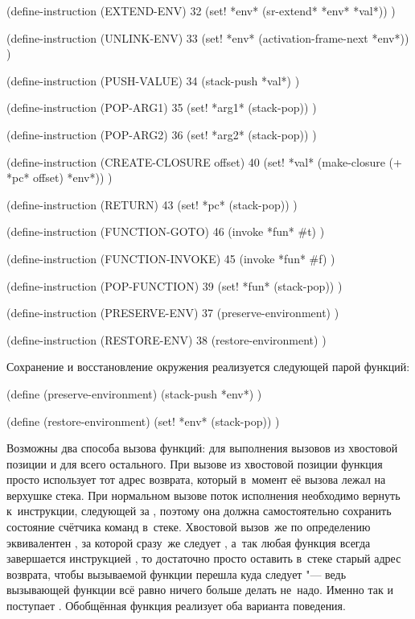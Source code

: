      
     
       
         
   
\begin{code:lisp}
(define-instruction (EXTEND-ENV) 32
  (set! *env* (sr-extend* *env* *val*)) )

(define-instruction (UNLINK-ENV) 33
  (set! *env* (activation-frame-next *env*)) )

(define-instruction (PUSH-VALUE) 34
  (stack-push *val*) )

(define-instruction (POP-ARG1) 35
  (set! *arg1* (stack-pop)) )

(define-instruction (POP-ARG2) 36
  (set! *arg2* (stack-pop)) )

(define-instruction (CREATE-CLOSURE offset) 40
  (set! *val* (make-closure (+ *pc* offset) *env*)) )

(define-instruction (RETURN) 43
  (set! *pc* (stack-pop)) )

(define-instruction (FUNCTION-GOTO) 46
  (invoke *fun* #t) )

(define-instruction (FUNCTION-INVOKE) 45
  (invoke *fun* #f) )

(define-instruction (POP-FUNCTION) 39
  (set! *fun* (stack-pop)) )

(define-instruction (PRESERVE-ENV) 37
  (preserve-environment) )

(define-instruction (RESTORE-ENV) 38
  (restore-environment) )
\end{code:lisp}

Сохранение и восстановление окружения реализуется следующей парой функций:

\begin{code:lisp}
(define (preserve-environment)
  (stack-push *env*) )

(define (restore-environment)
  (set! *env* (stack-pop)) )
\end{code:lisp}

Возможны два способа вызова функций:  для выполнения вызовов
из хвостовой позиции и  для всего остального. При вызове из
хвостовой позиции функция просто использует тот адрес возврата, который в~момент
её вызова лежал на верхушке стека. При нормальном вызове поток исполнения
необходимо вернуть к~инструкции, следующей за , поэтому
она должна самостоятельно сохранить состояние счётчика команд в~стеке. Хвостовой
вызов~же по определению эквивалентен , за которой сразу~же
следует , а~так любая функция всегда завершается инструкцией
, то достаточно просто оставить в~стеке старый адрес возврата, чтобы
 вызываемой функции перешла куда следует "--- ведь вызывающей функции
всё равно ничего больше делать не~надо. Именно так и поступает
. Обобщённая функция  реализует оба варианта
поведения.

